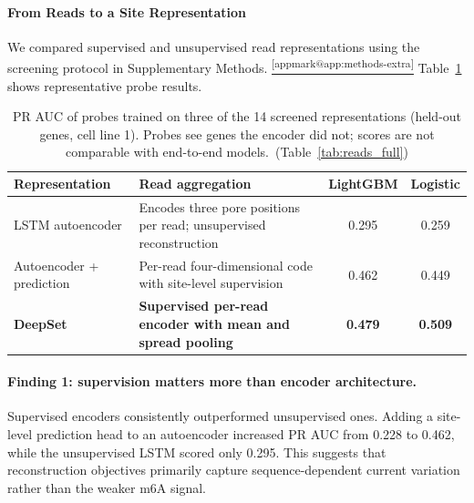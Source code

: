 \documentclass[11pt,a4paper]{article}
\makeatletter
\DeclareRobustCommand{\applink}[1]{%
    \hyperref[#1]{\textsuperscript{\ref*{appmark@#1}}}}
\makeatother
\begin{document}
\paragraph{From Reads to a Site Representation}



We compared supervised and unsupervised read representations using the
screening protocol in Supplementary Methods.\applink{app:methods-extra}
Table~\ref{tab:reads} shows representative probe results.

\begin{table}[H]
    \centering\small
    \begin{tabularx}{\linewidth}{lYcc}
        \toprule
        \textbf{Representation} & \textbf{Read aggregation} & \textbf{LightGBM} & \textbf{Logistic} \\
        \midrule
        LSTM autoencoder & Encodes three pore positions per read; unsupervised reconstruction & 0.295 & 0.259 \\
        Autoencoder + prediction & Per-read four-dimensional code with site-level supervision & 0.462 & 0.449 \\
        \textbf{DeepSet} & \textbf{Supervised per-read encoder with mean and spread pooling} & \textbf{0.479} & \textbf{0.509} \\
        \bottomrule
    \end{tabularx}
    \caption{PR AUC of probes trained on three of the 14 screened representations (held-out genes, cell line 1). Probes see genes the encoder did not; scores are not comparable with end-to-end models.~(Table~\ref{tab:reads_full})}
    \label{tab:reads}
\end{table}

\paragraph{Finding 1: supervision matters more than encoder architecture.}
Supervised encoders consistently outperformed unsupervised ones. Adding a site-level prediction head to an autoencoder increased PR AUC from 0.228 to 0.462, while the unsupervised LSTM scored only 0.295. This suggests that reconstruction objectives primarily capture sequence-dependent current variation rather than the weaker m6A signal.
\end{document}
